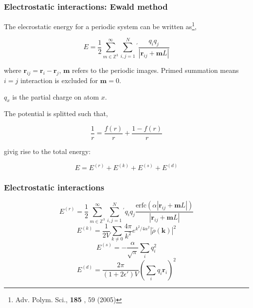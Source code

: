 \documentclass{beamer}
\begin{document}
\begin{frame}\frametitle{Electrostatic interactions: Ewald method}

The elecrostatic energy for a periodic system can be written as\footnote{{\scriptsize Adv. Polym. Sci.,  {\bf
185 }, 59 (2005)}},

\begin{equation}
	E= \frac{1}{2} \sum_{m \in \mathbb{Z}^3}^{\infty} \sum_{i,j=1}^{N}{}^{'} \frac{q_i q_j}{ |\mathbf{r}_{ij} + \mathbf{m}L| }
\end{equation}

where $\mathbf{r}_{ij} = \mathbf{r}_i -   \mathbf{r}_j$, $\mathbf{m}$ refers to the periodic 
images. Primed summation means $i=j$ interaction is excluded for $\mathbf{m}=0$.

$q_x$ is the partial charge on atom $x$.

 { 
The potential is splitted such that,

\begin{equation}
	\frac{1}{r} = \frac{f(r)}{r} + \frac{1-f(r)}{r}
\end{equation}
}

 { 
givig rise to the total energy:

\begin{equation}
	E = E^{(r)} +  E^{(k)} +  E^{(s)} +  E^{(d)}
\end{equation}
}

\end{frame}

\begin{frame}\frametitle{Electrostatic interactions}

\begin{equation}
	E^{(r)}  = \frac{1}{2} \sum_{m \in \mathbb{Z}^3}^{\infty} 
	\sum_{i,j=1}^{N}{}^{'} q_i q_j\frac{\textrm{erfc}(\alpha |\mathbf{r}_{ij} 
	+ \mathbf{m}L| )}{ |\mathbf{r}_{ij} + \mathbf{m}L| }
\end{equation}
\begin{equation}
	E^{(k)}  = \frac{1}{2V} \sum_{k \ne 0} \frac{4 \pi}{k^2} e^{k^2/4 \alpha^2} 
	|\tilde{\rho} (\mathbf{k})|^2 
\end{equation}
\begin{equation}
	E^{(s)}  = - \frac{\alpha}{\sqrt{\pi}} \sum_{i} q_i^2 
\end{equation}
\begin{equation}
	E^{(d)}  =  \frac{2 \pi}{(1+2\epsilon')V} (\sum_{i} q_i \mathbf{r}_i )^2 
\end{equation}
\end{frame}
\end{document}
